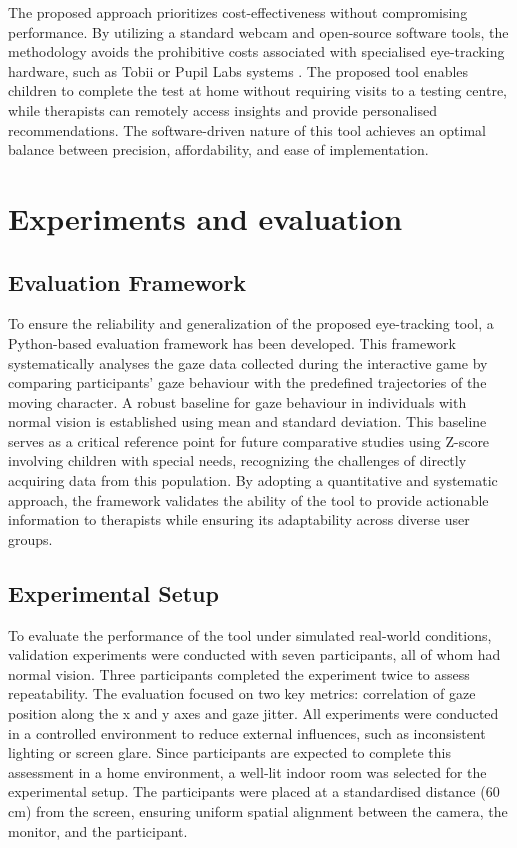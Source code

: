 \documentclass[10pt,a4paper,twoside]{article}
\begin{document}
The proposed approach prioritizes cost-effectiveness without compromising performance. By utilizing a standard webcam and open-source software tools, the methodology avoids the prohibitive costs associated with specialised eye-tracking hardware, such as Tobii \cite{tobii_reference} or Pupil Labs systems \cite{pupil_reference}. The proposed tool enables children to complete the test at home without requiring visits to a testing centre, while therapists can remotely access insights and provide personalised recommendations. The software-driven nature of this tool achieves an optimal balance between precision, affordability, and ease of implementation.

\section{Experiments and evaluation}
\label{Exp}

\subsection{Evaluation Framework}
\label{eval}

To ensure the reliability and generalization of the proposed eye-tracking tool, a Python-based evaluation framework has been developed. This framework systematically analyses the gaze data collected during the interactive game by comparing participants’ gaze behaviour with the predefined trajectories of the moving character. A robust baseline for gaze behaviour in individuals with normal vision is established using mean and standard deviation. This baseline serves as a critical reference point for future comparative studies using Z-score involving children with special needs, recognizing the challenges of directly acquiring data from this population. By adopting a quantitative and systematic approach, the framework validates the ability of the tool to provide actionable information to therapists while ensuring its adaptability across diverse user groups.

\subsection{Experimental Setup}
\label{setup}

To evaluate the performance of the tool under simulated real-world conditions, validation experiments were conducted with seven participants, all of whom had normal vision. Three participants completed the experiment twice to assess repeatability. The evaluation focused on two key metrics: correlation of gaze position along the x and y axes and gaze jitter. All experiments were conducted in a controlled environment to reduce external influences, such as inconsistent lighting or screen glare. Since participants are expected to complete this assessment in a home environment, a well‐lit indoor room was selected for the experimental setup. The participants were placed at a standardised distance (60 cm) from the screen, ensuring uniform spatial alignment between the camera, the monitor, and the participant.
\end{document}
